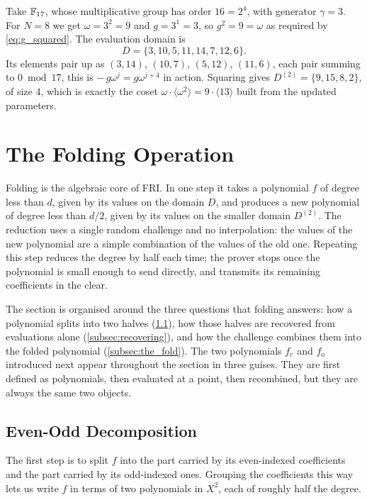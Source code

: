 \begin{example}
\label{ex:domain_f17}
Take $\mathbb{F}_{17}$, whose multiplicative group has order $16 = 2^4$, with
generator $\gamma = 3$. For $N = 8$ we get $\omega = 3^2 = 9$ and
$g = 3^1 = 3$, so $g^2 = 9 = \omega$ as required by
\cref{eq:g_squared}. The evaluation domain is
%
\[
D = \{3, 10, 5, 11, 14, 7, 12, 6\}.
\]
%
Its elements pair up as $(3,14)$, $(10,7)$, $(5,12)$, $(11,6)$, each
pair summing to $0 \bmod 17$, this is $-\,g\omega^{j} = g\omega^{j+4}$
in action. Squaring gives $D^{(2)} = \{9, 15, 8, 2\}$, of size $4$,
which is exactly the coset
$\omega\cdot\langle\omega^2\rangle = 9\cdot\langle 13\rangle$ built from
the updated parameters.
\end{example}


\section{The Folding Operation}
\label{sec:fri_folding}

Folding is the algebraic core of FRI. In one step it takes a polynomial
$f$ of degree less than $d$, given by its values on the domain $D$, and
produces a new polynomial of degree less than $d/2$, given by its values
on the smaller domain $D^{(2)}$. The reduction uses a single random
challenge and no interpolation: the values of the new polynomial are a
simple combination of the values of the old one. Repeating this step
reduces the degree by half each time; the prover stops once the
polynomial is small enough to send directly, and transmits its remaining
coefficients in the clear.

The section is organised around the three questions that folding
answers: how a polynomial splits into two halves
(\cref{subsec:even_odd}), how those halves are recovered from evaluations
alone (\cref{subsec:recovering}), and how the challenge combines them
into the folded polynomial (\cref{subsec:the_fold}). The two polynomials
$f_e$ and $f_o$ introduced next appear throughout the section in three
guises. They are first defined as polynomials, then evaluated at a point,
then recombined, but they are always the same two objects.


\subsection{Even-Odd Decomposition}
\label{subsec:even_odd}

The first step is to split $f$ into the part carried by its even-indexed
coefficients and the part carried by its odd-indexed ones. Grouping the
coefficients this way lets us write $f$ in terms of two polynomials in
$X^2$, each of roughly half the degree.

